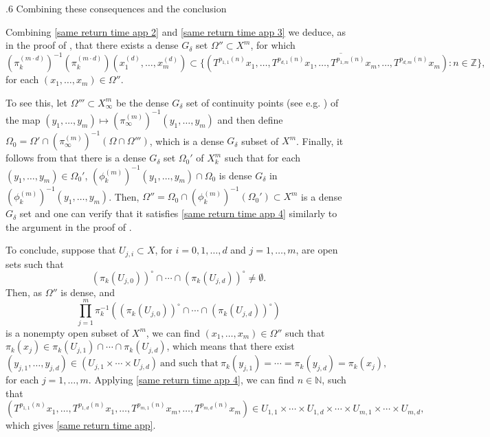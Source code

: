 \documentclass[reqno]{amsart}
\makeatletter
\def\Z{{\mathbb Z}}
\def\N{{\mathbb N}}
\theoremstyle{definition}
\def\subsection{\@startsection{subsection}{2}%
  \z@{.4\linespacing\@plus.7\linespacing}
{.6\baselineskip}%
  {\normalfont\centering\bfseries}%
}
\theoremstyle{remark}
\def\N{{\mathbb N}}
\makeatother
\begin{document}
\subsection{Combining these consequences and the conclusion}

Combining \eqref{same return time app 2} and 
\eqref{same return time app 3} we deduce, as in 
the proof of \cite[Theorem A]{Ye_Yu}, that there 
exists a dense $G_{\delta}$ set
$\Omega'' \subset X^m$, for which 
\begin{equation}\label{same return time app 4}(\pi_k^{(m\cdot d)})^{-1}(\pi_k^{(m\cdot d)})(x_1^{(d)},\ldots,x_m^{(d)}) \subset \overline{\{(T^{p_{1,1}(n)}x_1,\ldots,T^{p_{d,1}(n)}x_1,\ldots,T^{p_{1,m}(n)}x_m,\ldots,T^{p_{d,m}(n)}x_m):n\in \Z\}},
\end{equation}
for each $(x_1,\ldots,x_m)\in \Omega''$. 

To see this, let $\Omega''' \subset X^m_{\infty}$ be the dense $G_{\delta}$ set of continuity points (see e.g. \cite[Lemma 2.7]{Ye_Yu}) of the map $(y_1,\ldots,y_m)\mapsto (\pi_{\infty}^{(m)})^{-1}(y_1,\ldots,y_m)$ and then define $\Omega_0=\Omega' \cap (\pi_{\infty}^{(m)})^{-1}\left( \Omega \cap \Omega''' \right)$, which is a dense $G_{\delta}$ subset of $X^m$. Finally, it follows from \cite[Lemma 2.5]{Ye_Yu} that there is a dense $G_{\delta}$ set $\Omega_0'$ of $X^m_k$ such that for each $(y_1,\ldots,y_m)\in \Omega_0'$, $(\phi_k^{(m)})^{-1}(y_1,\ldots,y_m) \cap \Omega_0$ is dense $G_{\delta}$ in $(\phi_k^{(m)})^{-1}(y_1,\ldots,y_m)$. Then, $\Omega''=\Omega_0 \cap (\phi_k^{(m)})^{-1}(\Omega_0') \subset X^m$ is a dense $G_{\delta}$ set and one can verify that it satisfies \eqref{same return time app 4} similarly to the argument in the proof of \cite[Theorem A]{Ye_Yu}.


To conclude, suppose that $U_{j,i}\subset X$, for 
$i=0,1,\ldots,d$ and 
$j=1,\ldots,m$, are open sets such that 
$$(\pi_k(U_{j,0}))^{\circ} \cap \cdots \cap (\pi_k(U_{j,d}))^{\circ} \neq \emptyset.$$
Then, as $\Omega''$ is dense, and 
$$\prod_{j=1}^m \pi_k^{-1}\left( (\pi_k(U_{j,0}))^{\circ} \cap \cdots \cap (\pi_k(U_{j,d}))^{\circ} \right) $$
is a nonempty open subset of $X^m$, we can 
find $(x_1,\ldots,x_m)\in \Omega''$ such that $ \pi_k(x_j) \in \pi_k(U_{j,1}) \cap \cdots \cap \pi_k(U_{j,d})$, which means that there exist $$(y_{j,1},\ldots,y_{j,d}) \in (U_{j,1}\times \cdots \times U_{j,d})\ \text{and such that}\ \pi_k(y_{j,1})=\cdots = \pi_k(y_{j,d})=\pi_k(x_j),$$
for each $j=1,\ldots,m$. Applying \eqref{same return time app 4}, we can find $n\in \N$, such that 
$$(T^{p_{1,1}(n)}x_1,\ldots,T^{p_{1,d}(n)}x_1,\ldots,T^{p_{m,1}(n)}x_m,\ldots,T^{p_{m,d}(n)}x_m) \in U_{1,1}\times \cdots \times U_{1,d}\times \cdots \times U_{m,1}\times \cdots \times U_{m,d},$$
which gives \eqref{same return time app}.
\end{document}
